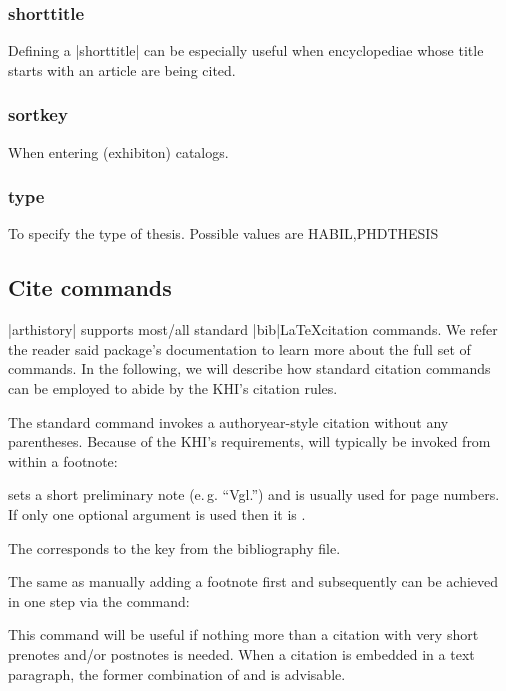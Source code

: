 \documentclass[a4paper,
10pt,
ngerman,
english
]{ltxdoc}
\begin{document}
\subsubsection{shorttitle}
Defining a |shorttitle| can be especially useful when encyclopediae whose title starts with an article are being cited.

\subsubsection{sortkey}
When entering (exhibiton) catalogs.

\subsubsection{type}
To specify the type of thesis. Possible values are HABIL,PHDTHESIS


\subsection{Cite commands}\label{cite-commands}
|arthistory| supports most/all standard |bib|\LaTeX citation commands. We refer the reader said package's documentation to learn more about the full set of commands. In the following, we will describe how standard citation commands can be employed to abide by the KHI's citation rules.


\DescribeMacro{\cite}%
The standard  command invokes a authoryear-style citation without any parentheses. Because of the KHI's requirements,  will typically be invoked from within a footnote:

 sets a short preliminary note (e.\,g. \enquote{Vgl.}) and  is usually used for page numbers.
If only one optional argument is used then it is .
The  corresponds to the key from the bibliography file.

\DescribeMacro{\footcite}
The same as manually adding a footnote first and  subsequently can be achieved in one step via the  command:
This command will be useful if nothing more than a citation with very short prenotes and/or postnotes is needed. When a citation is embedded in a text paragraph, the former combination of  and  is advisable.
\end{document}
